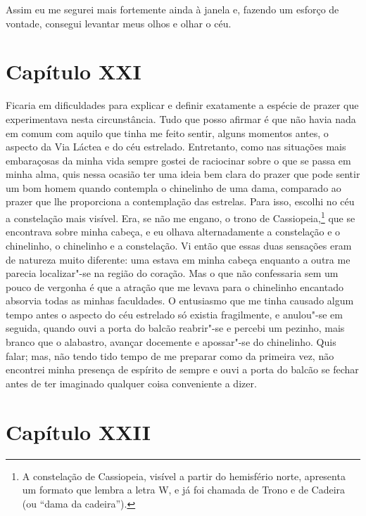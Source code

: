  Assim eu me segurei mais fortemente ainda à janela e, fazendo um
esforço de vontade, consegui levantar meus olhos e olhar o céu. 

\section*{Capítulo XXI}

 Ficaria em dificuldades para explicar e definir exatamente a espécie de
prazer que experimentava nesta circunstância. Tudo que posso afirmar é
que não havia nada em comum com aquilo que tinha me feito sentir,
alguns momentos antes, o aspecto da Via Láctea e do céu estrelado.
Entretanto, como nas situações mais embaraçosas da minha vida sempre
gostei de raciocinar sobre o que se passa em minha alma, quis nessa
ocasião ter uma ideia bem clara do prazer que pode sentir um bom homem
quando contempla o chinelinho de uma dama, comparado ao prazer que lhe
proporciona a contemplação das estrelas. Para isso, escolhi no céu a
constelação mais visível. Era, se não me engano, o trono de
Cassiopeia,\footnote{ A constelação de Cassiopeia, visível a partir do
hemisfério norte, apresenta um formato que lembra a letra W, e já foi
chamada de Trono e de Cadeira (ou ``dama da cadeira'').} que se
encontrava sobre minha cabeça, e eu olhava alternadamente a constelação
e o chinelinho, o chinelinho e a constelação. Vi então que essas duas
sensações eram de natureza muito diferente: uma estava em minha cabeça
enquanto a outra me parecia localizar"-se na região do coração. Mas o
que não confessaria sem um pouco de vergonha é que a atração que me
levava para o chinelinho encantado absorvia todas as minhas faculdades.
O entusiasmo que me tinha causado algum tempo antes o aspecto do céu
estrelado só existia fragilmente, e anulou"-se em seguida, quando ouvi a
porta do balcão reabrir"-se e percebi um pezinho, mais branco que o
alabastro, avançar docemente e apossar"-se do chinelinho. Quis falar;
mas, não tendo tido tempo de me preparar como da primeira vez, não
encontrei minha presença de espírito de sempre e ouvi a porta do balcão
se fechar antes de ter imaginado qualquer coisa conveniente a dizer.

\section*{Capítulo XXII}

